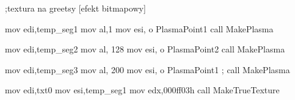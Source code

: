 ;textura na greetsy [efekt bitmapowy]

	mov   edi,temp_seg1
	mov   al,1
	mov   esi, o PlasmaPoint1
	call  MakePlasma

	mov   edi,temp_seg2
	mov   al, 128
	mov   esi, o PlasmaPoint2
	call  MakePlasma

	mov   edi,temp_seg3
	mov   al, 200
	mov   esi, o PlasmaPoint1
;	 call  MakePlasma

	mov   edi,txt0
	mov   esi,temp_seg1
	mov   edx,000ff03h
	call  MakeTrueTexture
